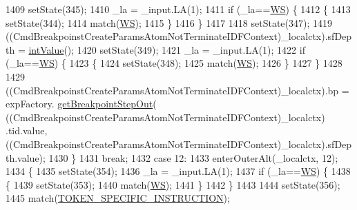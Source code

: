 \begin{DoxyCode}
1409         setState(345);
1410         \_la = \_input.LA(1);
1411         \textcolor{keywordflow}{if} (\_la==\hyperlink{classgov_1_1nasa_1_1jpf_1_1inspector_1_1server_1_1expression_1_1parser_1_1_expression_grammar_parser_ace44714ae633c7b14794cc5a24d9ebf3}{WS}) \{
1412           \{
1413           setState(344);
1414           match(\hyperlink{classgov_1_1nasa_1_1jpf_1_1inspector_1_1server_1_1expression_1_1parser_1_1_expression_grammar_parser_ace44714ae633c7b14794cc5a24d9ebf3}{WS});
1415           \}
1416         \}
1417 
1418         setState(347);
1419         ((CmdBreakpoinstCreateParamsAtomNotTerminateIDFContext)\_localctx).sfDepth = 
      \hyperlink{classgov_1_1nasa_1_1jpf_1_1inspector_1_1server_1_1expression_1_1parser_1_1_expression_grammar_parser_a8c7e4b657a12e07efe3ea6429cb9cdcf}{intValue}();
1420         setState(349);
1421         \_la = \_input.LA(1);
1422         \textcolor{keywordflow}{if} (\_la==\hyperlink{classgov_1_1nasa_1_1jpf_1_1inspector_1_1server_1_1expression_1_1parser_1_1_expression_grammar_parser_ace44714ae633c7b14794cc5a24d9ebf3}{WS}) \{
1423           \{
1424           setState(348);
1425           match(\hyperlink{classgov_1_1nasa_1_1jpf_1_1inspector_1_1server_1_1expression_1_1parser_1_1_expression_grammar_parser_ace44714ae633c7b14794cc5a24d9ebf3}{WS});
1426           \}
1427         \}
1428 
1429          ((CmdBreakpoinstCreateParamsAtomNotTerminateIDFContext)\_localctx).bp =  expFactory.
      \hyperlink{classgov_1_1nasa_1_1jpf_1_1inspector_1_1server_1_1expression_1_1_expression_factory_a5f799a26571fff4b866a4ef56600bf06}{getBreakpointStepOut}( ((CmdBreakpoinstCreateParamsAtomNotTerminateIDFContext)\_localctx)
      .tid.value, ((CmdBreakpoinstCreateParamsAtomNotTerminateIDFContext)\_localctx).sfDepth.value); 
1430         \}
1431         \textcolor{keywordflow}{break};
1432       \textcolor{keywordflow}{case} 12:
1433         enterOuterAlt(\_localctx, 12);
1434         \{
1435         setState(354);
1436         \_la = \_input.LA(1);
1437         \textcolor{keywordflow}{if} (\_la==\hyperlink{classgov_1_1nasa_1_1jpf_1_1inspector_1_1server_1_1expression_1_1parser_1_1_expression_grammar_parser_ace44714ae633c7b14794cc5a24d9ebf3}{WS}) \{
1438           \{
1439           setState(353);
1440           match(\hyperlink{classgov_1_1nasa_1_1jpf_1_1inspector_1_1server_1_1expression_1_1parser_1_1_expression_grammar_parser_ace44714ae633c7b14794cc5a24d9ebf3}{WS});
1441           \}
1442         \}
1443 
1444         setState(356);
1445         match(\hyperlink{classgov_1_1nasa_1_1jpf_1_1inspector_1_1server_1_1expression_1_1parser_1_1_expression_grammar_parser_ae953f0c3e17d835243c584843a9a7785}{TOKEN\_SPECIFIC\_INSTRUCTION});

\end{DoxyCode}
